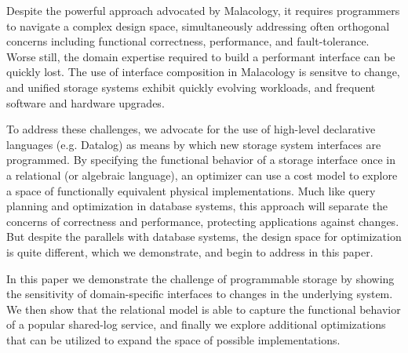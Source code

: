 Despite the powerful approach advocated by Malacology, it requires programmers
to navigate a complex design space, simultaneously addressing often orthogonal
concerns including functional correctness, performance, and fault-tolerance.
Worse still, the domain expertise required to build a performant interface can
be quickly lost. The use of interface composition in Malacology is sensitve to
change, and unified storage systems exhibit quickly evolving workloads, and
frequent software and hardware upgrades.

To address these challenges, we advocate for the use of high-level declarative
languages (e.g. Datalog) as means by which new storage system interfaces are
programmed. By specifying the functional behavior of a storage interface once
in a relational (or algebraic language), an optimizer can use a cost model to
explore a space of functionally equivalent physical implementations. Much like
query planning and optimization in database systems, this approach will
separate the concerns of correctness and performance, protecting applications
against changes. But despite the parallels with database systems, the design
space for optimization is quite different, which we demonstrate, and begin to
address in this paper.

In this paper we demonstrate the challenge of programmable storage by showing
the sensitivity of domain-specific interfaces to changes in the underlying
system. We then show that the relational model is able to capture the
functional behavior of a popular shared-log service, and finally we explore
additional optimizations that can be utilized to expand the space of
possible implementations.

